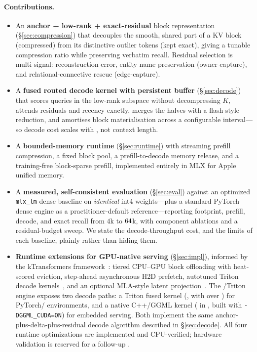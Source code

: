 \paragraph{Contributions.}
\begin{itemize}[leftmargin=1.2em,itemsep=2pt,topsep=2pt]
  \item An \textbf{anchor + low-rank + exact-residual} block representation
    (\S\ref{sec:compression}) that decouples the smooth, shared part of a KV block (compressed)
    from its distinctive outlier tokens (kept exact), giving a tunable compression ratio while
    preserving verbatim recall. Residual selection is multi-signal: reconstruction error, entity
    name preservation (owner-capture), and relational-connective rescue (edge-capture).
  \item A \textbf{fused routed decode kernel with persistent buffer} (\S\ref{sec:decode}) that
    scores queries in the low-rank subspace without decompressing $K$, attends residuals and
    recency exactly, merges the halves with a flash-style reduction, and amortises block
    materialisation across a configurable interval---so decode cost scales with \topk{}, not
    context length.
  \item A \textbf{bounded-memory runtime} (\S\ref{sec:runtime}) with streaming prefill
    compression, a fixed block pool, a prefill-to-decode memory release, and a training-free
    block-sparse prefill, implemented entirely in MLX for Apple unified memory.
  \item A \textbf{measured, self-consistent evaluation} (\S\ref{sec:eval}) against an optimized
    \texttt{mlx\_lm} dense baseline on \emph{identical} int4 weights---plus a standard PyTorch
    dense engine as a practitioner-default reference---reporting footprint, prefill, decode, and
    exact recall from $4$k to $64$k, with component ablations and a residual-budget sweep. We
    state the decode-throughput cost, and the limits of each baseline, plainly rather than hiding
    them.
  \item \textbf{Runtime extensions for GPU-native serving} (\S\ref{sec:impl}), informed by the
    kTransformers framework~\cite{yang2025ktransformers}: tiered CPU--GPU block offloading with
    heat-scored eviction, step-ahead asynchronous H2D prefetch, autotuned Triton decode
    kernels~\cite{tillet2019triton}, and an optional MLA-style latent
    projection~\cite{deepseekv2}. The \cuda{}/Triton engine exposes two decode paths:
    a Triton fused kernel (, with 
    over ) for PyTorch/\cuda{} environments, and
    a native C++/GGML kernel ( in ,
    built with \texttt{-DGGML\_CUDA=ON}) for embedded serving. Both implement the same
    anchor-plus-delta-plus-residual decode algorithm described in \S\ref{sec:decode}. All four
    runtime optimizations are implemented and CPU-verified; \cuda{} hardware
    validation is reserved for a follow-up \pendingGPU{}.
\end{itemize}


